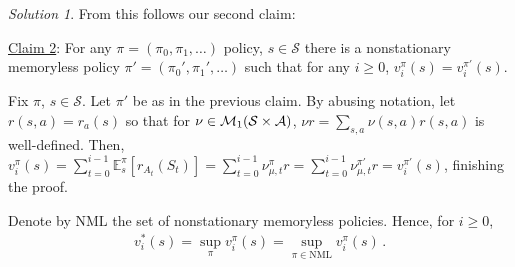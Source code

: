 \documentclass{article}
\newcommand{\E}{\mathbb{E}}
\DeclareMathOperator*{\1}{\mathbbm{1}}
\newcommand{\0}{\mathbf{0}}
\theoremstyle{definition}
\theoremstyle{remark}
\newtheorem*{solution*}{Solution}
\theoremstyle{theorem}
\newcommand{\cS}{\mathcal{S}}
\newcommand{\cA}{\mathcal{A}}
\begin{document}
\begin{solution*}
From this follows our second claim:

\noindent \underline{Claim 2}: For any $\pi  = (\pi_0,\pi_1,\dots)$ policy, $s\in \cS$ there is a nonstationary memoryless policy $\pi'=(\pi_0',\pi_1',\dots)$ such that 
for any $i\ge 0$, $v_i^{\pi}(s) = v_i^{\pi'}(s)$.

Fix $\pi$, $s\in \cS$. Let $\pi'$ be as in the previous claim. By abusing notation, let $r(s,a) = r_a(s)$ so that for $\nu \in \cM_1(\cS\times\cA)$, $\nu r = \sum_{s,a} \nu(s,a)r(s,a)$ is well-defined.
Then, $v_i^\pi(s) = \sum_{t=0}^{i-1} \E_s^\pi[ r_{A_t}(S_t) ]
= \sum_{t=0}^{i-1}  \nu_{\mu,t}^\pi r = \sum_{t=0}^{i-1}  \nu_{\mu,t}^{\pi'} r = v_i^{\pi'}(s)$, finishing the proof.

Denote by $\text{NML}$ the set of nonstationary memoryless policies.
Hence, for $i\ge 0$,
\begin{align}
v_i^*(s) = \sup_{\pi} v_i^\pi(s) = \sup_{\pi \in \text{NML}} v_i^{\pi}(s)\,.
\label{eq:nmle}
\end{align}


\end{solution*}
\end{document}
